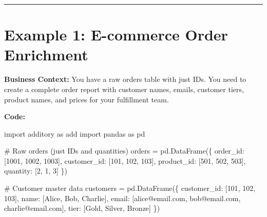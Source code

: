 \documentclass[
  letterpaper,
]{scrbook}
\newenvironment{Shaded}{\begin{snugshade}}{\end{snugshade}}
\newcommand{\CommentTok}[1]{\textcolor[rgb]{0.37,0.37,0.37}{#1}}
\newcommand{\DecValTok}[1]{\textcolor[rgb]{0.68,0.00,0.00}{#1}}
\newcommand{\ImportTok}[1]{\textcolor[rgb]{0.00,0.46,0.62}{#1}}
\newcommand{\NormalTok}[1]{\textcolor[rgb]{0.00,0.23,0.31}{#1}}
\newcommand{\OperatorTok}[1]{\textcolor[rgb]{0.37,0.37,0.37}{#1}}
\newcommand{\StringTok}[1]{\textcolor[rgb]{0.13,0.47,0.30}{#1}}
\begin{document}
\begin{center}\rule{0.5\linewidth}{0.5pt}\end{center}

\section{Example 1: E-commerce Order
Enrichment}\label{example-1-e-commerce-order-enrichment}

\textbf{Business Context:} You have a raw orders table with just IDs.
You need to create a complete order report with customer names, emails,
customer tiers, product names, and prices for your fulfillment team.

\textbf{Code:}

\begin{Shaded}
\begin{Highlighting}[]
\ImportTok{import}\NormalTok{ additory }\ImportTok{as}\NormalTok{ add}
\ImportTok{import}\NormalTok{ pandas }\ImportTok{as}\NormalTok{ pd}

\CommentTok{\# Raw orders (just IDs and quantities)}
\NormalTok{orders }\OperatorTok{=}\NormalTok{ pd.DataFrame(\{}
    \StringTok{\textquotesingle{}order\_id\textquotesingle{}}\NormalTok{: [}\DecValTok{1001}\NormalTok{, }\DecValTok{1002}\NormalTok{, }\DecValTok{1003}\NormalTok{],}
    \StringTok{\textquotesingle{}customer\_id\textquotesingle{}}\NormalTok{: [}\DecValTok{101}\NormalTok{, }\DecValTok{102}\NormalTok{, }\DecValTok{103}\NormalTok{],}
    \StringTok{\textquotesingle{}product\_id\textquotesingle{}}\NormalTok{: [}\DecValTok{501}\NormalTok{, }\DecValTok{502}\NormalTok{, }\DecValTok{503}\NormalTok{],}
    \StringTok{\textquotesingle{}quantity\textquotesingle{}}\NormalTok{: [}\DecValTok{2}\NormalTok{, }\DecValTok{1}\NormalTok{, }\DecValTok{3}\NormalTok{]}
\NormalTok{\})}

\CommentTok{\# Customer master data}
\NormalTok{customers }\OperatorTok{=}\NormalTok{ pd.DataFrame(\{}
    \StringTok{\textquotesingle{}customer\_id\textquotesingle{}}\NormalTok{: [}\DecValTok{101}\NormalTok{, }\DecValTok{102}\NormalTok{, }\DecValTok{103}\NormalTok{],}
    \StringTok{\textquotesingle{}name\textquotesingle{}}\NormalTok{: [}\StringTok{\textquotesingle{}Alice\textquotesingle{}}\NormalTok{, }\StringTok{\textquotesingle{}Bob\textquotesingle{}}\NormalTok{, }\StringTok{\textquotesingle{}Charlie\textquotesingle{}}\NormalTok{],}
    \StringTok{\textquotesingle{}email\textquotesingle{}}\NormalTok{: [}\StringTok{\textquotesingle{}alice@email.com\textquotesingle{}}\NormalTok{, }\StringTok{\textquotesingle{}bob@email.com\textquotesingle{}}\NormalTok{, }\StringTok{\textquotesingle{}charlie@email.com\textquotesingle{}}\NormalTok{],}
    \StringTok{\textquotesingle{}tier\textquotesingle{}}\NormalTok{: [}\StringTok{\textquotesingle{}Gold\textquotesingle{}}\NormalTok{, }\StringTok{\textquotesingle{}Silver\textquotesingle{}}\NormalTok{, }\StringTok{\textquotesingle{}Bronze\textquotesingle{}}\NormalTok{]}
\NormalTok{\})}


\end{Highlighting}
\end{Shaded}
\end{document}
